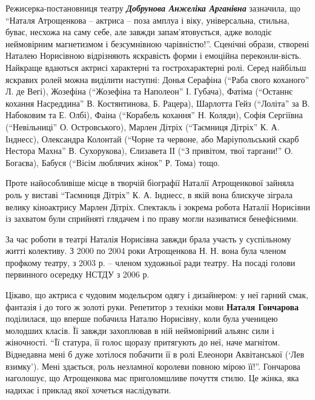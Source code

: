 Режисерка-постановниця театру \emph{\textbf{Добрунова Анжеліка Арганівна}} зазначила, що
\enquote{Наталя Атрощенкова – актриса – поза амплуа і віку, універсальна, стильна,
буває, несхожа на саму себе, але завжди запам'ятовується, адже володіє
неймовірним магнетизмом і безсумнівною чарівністю!}. Сценічні образи, створені
Наталею Норисівною відрізняють яскравість форми і емоційна переконли\hyp{}вість.
Найкраще вдаються актрисі характерні та гострохарактерні ролі. Серед найбільш
яскравих ролей можна виділити наступні: Донья Серафіна (\enquote{Раба свого коханого}
Л. де Вегі), Жозефіна (\enquote{Жозефіна та Наполеон} І. Губача), Фатіма (\enquote{Останнє
кохання Насреддина} В. Костянтинова, Б. Рацера), Шарлотта Гейз (\enquote{Лоліта} за
В. Набоковим та Е. Олбі), Фаіна (\enquote{Корабель кохання} Н. Коляди), Софія Сергіївна
(\enquote{Невільниці} О. Островського), Марлен Дітріх (\enquote{Таємниця Дітріх} К. А. Інднесс),
Олександра Колонтай (\enquote{Чорне та червоне, або Маріупольський скарб Нестора Махна}
В. Сухорукова), Єлизавета ІІ (\enquote{З привітом, твої таргани!} О. Богаєва), Бабуся
(\enquote{Вісім люблячих жінок} Р. Тома) тощо.


Проте найособливіше місце в творчій біографії Наталії Атрощенкової зайняла роль
у виставі \enquote{Таємниця Дітріх} К. А. Інднесс, в якій вона блискуче зіграла
велику кіноактрису Марлен Дітріх. Спектакль і зокрема робота Наталії Норисівни
із захватом були сприйняті глядачем і по праву могли називатися бенефісними.

За час роботи в театрі Наталія Норисівна завжди брала участь у суспільному
житті колективу. З 2000 по 2004 роки Атрощенкова Н. Н. вона була членом профкому
театру, з 2003 р. – членом художньої ради театру. На посаді голови первинного
осередку НСТДУ з 2006 р.

Цікаво, що актриса є чудовим модельєром  одягу і дизайнером: у неї гарний смак,
фантазія і до того ж золоті руки. Репетитор з техніки мови \textbf{Наталя Гончарова}
поділилася, що вперше побачила Наталю Норисівну, коли була ученицею молодших
класів. Її завжди захоплював в ній неймовірний альянс сили і жіночності. \enquote{Її
статура, її голос щоразу притягують до неї, наче магнітом. Віднедавна мені б
дуже хотілося побачити її в ролі Елеонори Аквітанської (\enquote{Лев взимку}). Мені
здається, роль незламної королеви повною мірою її!}. Гончарова наголошує, що
Атрощенкова має приголомшливе почуття стилю. Це жінка, яка надихає і приклад
якої хочеться наслідувати.

